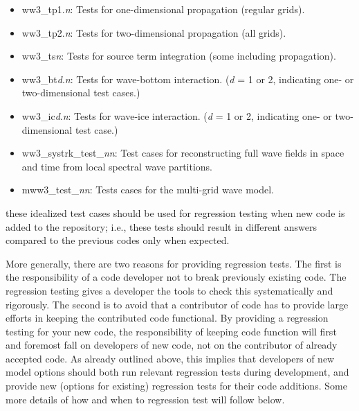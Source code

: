 \documentclass[12pt]{article}
\newcommand{\file}{\sf}
\begin{document}
\begin{itemize}

\item {\file ww3\_tp1.{\it n}}: Tests for one-dimensional propagation (regular
       grids). 

\item {\file ww3\_tp2.{\it n}}: Tests for two-dimensional propagation (all
       grids).

\item {\file ww3\_ts{\it n}}: Tests for source term integration (some
       including propagation).

\item {\file ww3\_bt{\it d}.{\it n}}: Tests for wave-bottom  interaction.
       ({\it d} = 1 or 2, indicating one- or two-dimensional test cases.)

\item {\file ww3\_ic{\it d}.{\it n}}: Tests for wave-ice interaction.
       ({\it d} = 1 or 2, indicating one- or two-dimensional test case.)

\item {\file ww3\_systrk\_test\_{\it nn}}: Test cases for reconstructing full
        wave fields in space and time from local spectral wave partitions.

\item {\file mww3\_test\_{\it nn}}: Tests cases for the multi-grid wave model.
\end{itemize}

\noindent
these idealized test cases should be used for regression testing when new code
is added to the repository; i.e., these tests should result in different
answers compared to the previous codes only when expected. 

More generally, there are two reasons for providing regression tests. The
first is the responsibility of a code developer not to break previously
existing code. The regression testing gives a developer the tools to check
this systematically and rigorously. The second is to avoid that a contributor
of code has to provide large efforts in keeping the contributed code
functional. By providing a regression testing for your new code, the
responsibility of keeping code function will first and foremost fall on
developers of new code, not on the contributor of already accepted code. As
already outlined above, this implies that developers of new model options
should both run relevant regression tests during development, and provide new
(options for existing) regression tests for their code additions. Some more
details of how and when to regression test will follow below.
\end{document}
